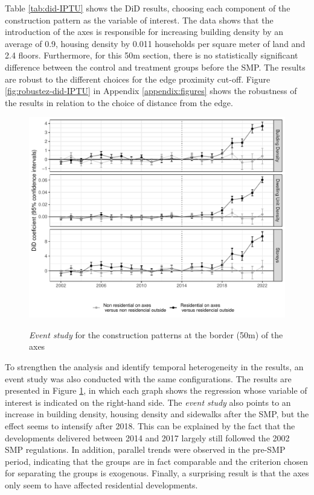 

Table \ref{tab:did-IPTU} shows the DiD results, choosing each component of the construction pattern as the variable of interest. The data shows that the introduction of the axes is responsible for increasing building density by an average of 0.9, housing density by 0.011 households per square meter of land and 2.4 floors. Furthermore, for this 50m section, there is no statistically significant difference between the control and treatment groups before the SMP. The results are robust to the different choices for the edge proximity cut-off. Figure \ref{fig:robustez-did-IPTU} in Appendix \ref{appendix:figures} shows the robustness of the results in relation to the choice of distance from the edge.

\begin{figure}[h]
    \centering
    \caption{\textit{Event study} for the construction patterns at the border (50m) of the axes}
    \includegraphics[width = .9\textwidth]{figuras/event-study.pdf}
    \label{fig:event-study}
\end{figure}

To strengthen the analysis and identify temporal heterogeneity in the results, an event study was also conducted with the same configurations. The results are presented in Figure \ref{fig:event-study}, in which each graph shows the regression whose variable of interest is indicated on the right-hand side. The \textit{event study} also points to an increase in building density, housing density and sidewalks after the SMP, but the effect seems to intensify after 2018. This can be explained by the fact that the developments delivered between 2014 and 2017 largely still followed the 2002 SMP regulations. In addition, parallel trends were observed in the pre-SMP period, indicating that the groups are in fact comparable and the criterion chosen for separating the groups is exogenous. Finally, a surprising result is that the axes only seem to have affected residential developments.

